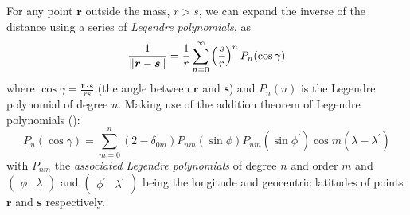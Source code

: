 For any point $\bm{r}$ outside the mass, $r > s$, we can expand the inverse of the 
distance using a series of \emph{Legendre polynomials}, as
\begin{equation}
  \frac{1}{\lVert\bm{r}-\bm{s}\rVert} = \frac{1}{r} \sum_{n=0}^{\infty} 
    \left( \frac{s}{r} \right) ^n  P_n ( \cos \gamma )
\end{equation}
where $\cos \gamma = \frac{\bm{r} \cdot \bm{s}}{rs}$ (the angle between $\bm{r}$
and $\bm{s}$) and $P_n(u)$ is the Legendre polynomial of degree $n$. Making use of 
the addition theorem of Legendre polynomials (\cite{Montenbruck2000}):
\begin{equation}
  \label{eq:mont38}
  P_n (\cos \gamma ) = \sum_{m=0}^{n} \left( 2 - \delta _{0m} \right) 
    P_{nm} (\sin \phi ) P_{nm} (\sin{\phi ^\prime}) 
    \cos{m \left( \lambda - \lambda ^\prime \right) }
\end{equation}
with $P_{nm}$ the \emph{associated Legendre polynomials} of degree $n$ and order 
$m$ and $\begin{pmatrix} \phi & \lambda \end{pmatrix}$ and 
$\begin{pmatrix} \phi ^\prime & \lambda ^\prime \end{pmatrix}$ being the longitude 
and geocentric latitudes of points $\bm{r}$ and $\bm{s}$ respectively.

